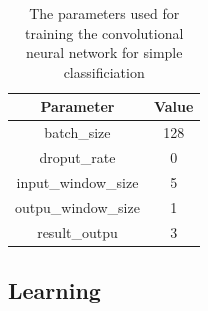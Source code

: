 \begin{table}[h]
\begin{center}
\begin{tabular}{ |c|c|}
\hline
Parameter & Value\\
\hline
batch\_size & 128  \\
droput\_rate & 0 \\
input\_window\_size & 5\\
outpu\_window\_size & 1\\
result\_outpu & 3\\
\hline
\end{tabular}
\caption{\label{tab:rl_conv_params} The parameters used for training the convolutional neural network for simple classificiation}
\end{center}
\end{table}

\subsection{Learning}


